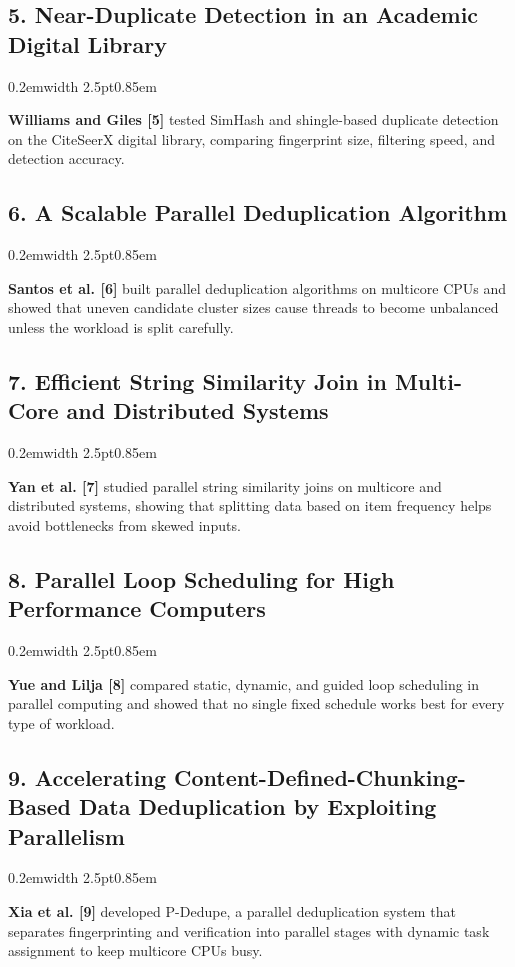 \documentclass[11pt,a4paper]{article}
\renewcommand{\_}{\textunderscore\allowbreak}
\newenvironment{litquote}{%
  \par\vspace{0.15em}%
  \noindent\kern0.2em\textcolor{quoteborder}{\vrule width 2.5pt}\kern0.85em%
  \begin{minipage}{\dimexpr\textwidth-1.3em\relax}%
  \itshape\color{black!88}%
}{%
  \end{minipage}\par\vspace{0.35em}%
}
\begin{document}
\subsection*{5. Near-Duplicate Detection in an Academic Digital Library}
\begin{litquote}
\textbf{Williams and Giles [5]} tested SimHash and shingle-based duplicate detection on the CiteSeerX digital library, comparing fingerprint size, filtering speed, and detection accuracy.
\end{litquote}

\subsection*{6. A Scalable Parallel Deduplication Algorithm}
\begin{litquote}
\textbf{Santos et al. [6]} built parallel deduplication algorithms on multicore CPUs and showed that uneven candidate cluster sizes cause threads to become unbalanced unless the workload is split carefully.
\end{litquote}

\subsection*{7. Efficient String Similarity Join in Multi-Core and Distributed Systems}
\begin{litquote}
\textbf{Yan et al. [7]} studied parallel string similarity joins on multicore and distributed systems, showing that splitting data based on item frequency helps avoid bottlenecks from skewed inputs.
\end{litquote}

\subsection*{8. Parallel Loop Scheduling for High Performance Computers}
\begin{litquote}
\textbf{Yue and Lilja [8]} compared static, dynamic, and guided loop scheduling in parallel computing and showed that no single fixed schedule works best for every type of workload.
\end{litquote}

\subsection*{9. Accelerating Content-Defined-Chunking-Based Data Deduplication by Exploiting Parallelism}
\begin{litquote}
\textbf{Xia et al. [9]} developed P-Dedupe, a parallel deduplication system that separates fingerprinting and verification into parallel stages with dynamic task assignment to keep multicore CPUs busy.
\end{litquote}
\end{document}
